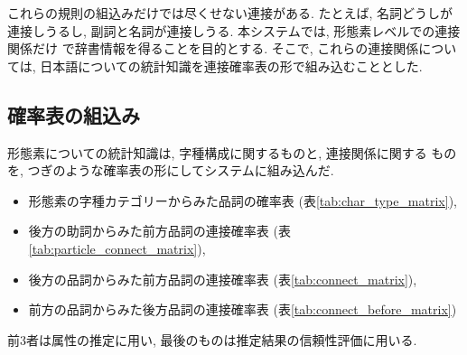 これらの規則の組込みだけでは尽くせない連接がある.  
たとえば, 名詞どうしが連接しうるし, 
副詞と名詞が連接しうる.  
本システムでは, 形態素レベルでの連接関係だけ
で辞書情報を得ることを目的とする.  
そこで, これらの連接関係については, 
日本語についての統計知識を連接確率表の形で組み込むこととした.  

\subsection{確率表の組込み}
形態素についての統計知識は, 字種構成に関するものと, 連接関係に関する
ものを, つぎのような確率表の形にしてシステムに組み込んだ.  
\begin{itemize}
\item
形態素の字種カテゴリーからみた品詞の確率表
(表\ref{tab:char_type_matrix}), 
\item
後方の助詞からみた前方品詞の連接確率表
(表\ref{tab:particle_connect_matrix}), 
\item
後方の品詞からみた前方品詞の連接確率表
(表\ref{tab:connect_matrix}), 
\item
前方の品詞からみた後方品詞の連接確率表
(表\ref{tab:connect_before_matrix})
\end{itemize}
前3者は属性の推定に用い, 
最後のものは推定結果の信頼性評価に用いる.

